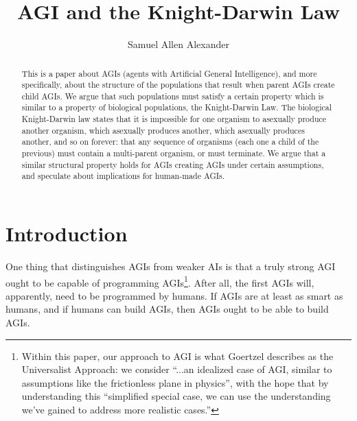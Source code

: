 \documentclass[runningheads]{llncs}
\begin{document}
\title{AGI and the Knight-Darwin Law}

\author{Samuel Allen Alexander}

\maketitle

\begin{abstract}
This is a paper about AGIs (agents with Artificial General Intelligence),
and more specifically, about the structure of the populations that
result when parent AGIs create child AGIs. We argue that such populations must
satisfy a certain property which is similar to a property of biological
populations, the Knight-Darwin Law.
The biological Knight-Darwin law states that it is impossible for one organism
to asexually produce another organism, which asexually produces another,
which asexually produces another, and so on forever:
that any sequence of organisms (each one a child of the previous) must contain
a multi-parent organism, or must terminate. We argue that a similar
structural property holds for AGIs creating AGIs under certain assumptions,
and speculate about implications for human-made AGIs.


\end{abstract}

\section{Introduction}

One thing that distinguishes AGIs from weaker AIs is that a truly
strong AGI ought to be capable of programming AGIs\footnote{Within this paper,
our approach to AGI is what Goertzel \cite{goertzel2014artificial} describes
as the Universalist Approach:
we consider ``...an idealized case of AGI, similar to
assumptions like the frictionless plane in physics'', with the hope that by
understanding this ``simplified special
case, we can use the understanding we've gained to address more realistic
cases.''}. After all, the first AGIs will,
apparently, need to be programmed by humans. If AGIs are at least as smart as
humans, and if humans can
build AGIs, then AGIs ought to be able to build AGIs.
\end{document}
